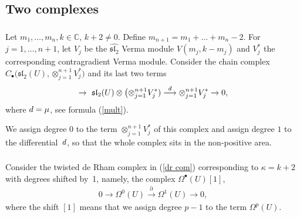 \documentclass[11pt]{article}
\numberwithin{equation}{section}
\begin{document}
\subsection{Two complexes}

\subsubsection{} Let $m_1,\dots,m_n, k\in{\mathbb C} $, $k+2\ne 0$. Define $m_{n+1}=m_1+\dots+m_n-2$. For $j=1,\dots, n+1$, let $V_j$ be the $\widehat{{\mathfrak{sl}_2}}$ Verma module $V(m_j,k-m_j)$ and $V_j^*$ the corresponding contragradient Verma module. Consider the chain complex $C_{\bullet}\big(\mathfrak{sl}_2(U), \otimes_{j=1}^{n+1}V_j^*\big)$ and its last two terms{\samepage
\begin{gather*}%
\to\ \mathfrak{sl}_2(U) \otimes \big({\otimes}_{j=1}^{n+1}V_j^*)\overset{{\rm d}}{\longrightarrow} \otimes_{j=1}^{n+1}V_j^* \to 0,
\end{gather*}
where ${\rm d}=\mu$, see formula (\ref{mult}).}

We assign degree $0$ to the term $\otimes_{j=1}^{n+1}V_j^*$ of this complex and assign degree $1$ to the differential~${\rm d}$, so that the whole complex sits in the non-positive area.

\subsubsection{} Consider the twisted de Rham complex in (\ref{dr com}) corresponding to $\kappa=k+2$ with degrees shifted by~1, namely, the complex $\Omega^{\bullet}(U)[1]$,
\begin{gather*}%
 0\to\Omega^0(U) \overset{\partial}{\longrightarrow} \Omega^1(U)\to 0,
\end{gather*}
where the shift $[1]$ means that we assign degree $p-1$ to the term $\Omega^p(U)$.
\end{document}
